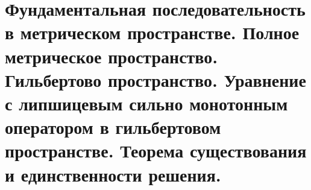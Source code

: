 \documentclass[__main__.tex]{subfiles}
\begin{document}
\section{Фундаментальная последовательность в метрическом пространстве. Полное метрическое пространство. Гильбертово пространство. Уравнение с липшицевым сильно монотонным оператором в гильбертовом пространстве. Теорема существования и единственности решения.}
\end{document}
